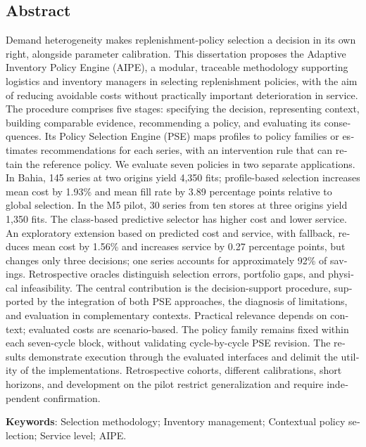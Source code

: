 \begin{otherlanguage}{english}
\chapter*{\centering Abstract}
Demand heterogeneity makes replenishment-policy selection a decision in its own right, alongside parameter calibration. This dissertation proposes the Adaptive Inventory Policy Engine (AIPE), a modular, traceable methodology supporting logistics and inventory managers in selecting replenishment policies, with the aim of reducing avoidable costs without practically important deterioration in service. The procedure comprises five stages: specifying the decision, representing context, building comparable evidence, recommending a policy, and evaluating its consequences. Its Policy Selection Engine (PSE) maps profiles to policy families or estimates recommendations for each series, with an intervention rule that can retain the reference policy. We evaluate seven policies in two separate applications. In Bahia, 145 series at two origins yield 4,350 fits; profile-based selection increases mean cost by 1.93\% and mean fill rate by 3.89 percentage points relative to global selection. In the M5 pilot, 30 series from ten stores at three origins yield 1,350 fits. The class-based predictive selector has higher cost and lower service. An exploratory extension based on predicted cost and service, with fallback, reduces mean cost by 1.56\% and increases service by 0.27 percentage points, but changes only three decisions; one series accounts for approximately 92\% of savings. Retrospective oracles distinguish selection errors, portfolio gaps, and physical infeasibility. The central contribution is the decision-support procedure, supported by the integration of both PSE approaches, the diagnosis of limitations, and evaluation in complementary contexts. Practical relevance depends on context; evaluated costs are scenario-based. The policy family remains fixed within each seven-cycle block, without validating cycle-by-cycle PSE revision. The results demonstrate execution through the evaluated interfaces and delimit the utility of the implementations. Retrospective cohorts, different calibrations, short horizons, and development on the pilot restrict generalization and require independent confirmation.

\vspace{2em}
\textbf{Keywords}: Selection methodology; Inventory management; Contextual policy selection; Service level; AIPE.
\end{otherlanguage}
